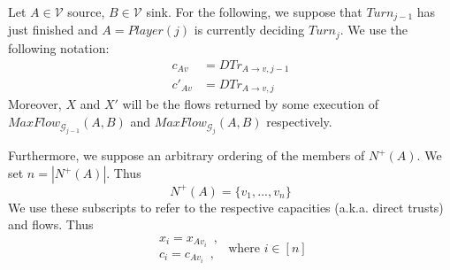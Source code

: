 Let $A \in \mathcal{V}$ source, $B \in \mathcal{V}$ sink. For the following, we suppose that $Turn_{j-1}$ has just finished
and $A = Player\left(j\right)$ is currently deciding $Turn_j$. We use the following notation:
\begin{align*}
   c_{Av} &= DTr_{A \rightarrow v, j-1} \\
   c'_{Av} &= DTr_{A \rightarrow v, j}
\end{align*}
Moreover, $X$ and $X'$ will be the flows returned by some execution of
$MaxFlow_{\mathcal{G}_{j-1}}\left(A, B\right)$ and $MaxFlow_{\mathcal{G}_j}\left(A, B\right)$ respectively.

Furthermore, we suppose an arbitrary ordering of the members of $N^{+}\left(A\right)$. We set $n = |N^{+}\left(A\right)|$.
Thus
\begin{equation*}
   N^{+}\left(A\right) = \{v_1, ..., v_n\}
\end{equation*}
We use these subscripts to refer to the respective capacities (a.k.a. direct trusts) and flows. Thus
\begin{equation*}
   \begin{array}{l}
      x_i = x_{Av_i} \enspace, \\
      c_i = c_{Av_i} \enspace,
   \end{array}
   \mbox{ where } i \in [n]
\end{equation*}

